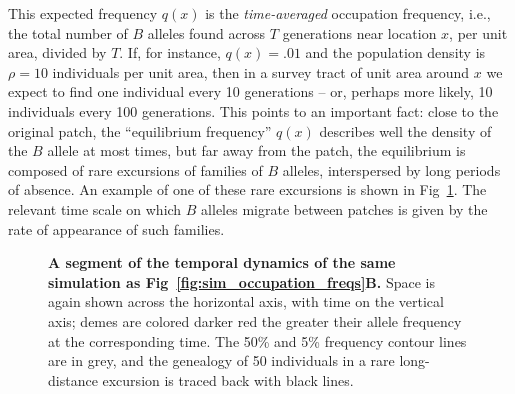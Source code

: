 \documentclass[10pt,letterpaper]{article}
\begin{document}
This expected frequency $q(x)$ is the \emph{time-averaged} occupation frequency,
i.e., the total number of $B$ alleles found across $T$ generations near location $x$, per unit area, divided by $T$.
If, for instance, $q(x)=.01$ and the population density is $\rho=10$ individuals per unit area, 
then in a survey tract of unit area around $x$ we expect to find one individual every 10 generations
-- or, perhaps more likely, 10 individuals every 100 generations.
This points to an important fact: 
close to the original patch, the ``equilibrium frequency'' $q(x)$ describes well the density of the $B$ allele at most times,
but far away from the patch, 
the equilibrium is composed of rare excursions of families of $B$
alleles, interspersed by long periods of absence. 
An example of one of these rare excursions is shown in Fig~\ref{fig:sim_snapshots}.
The relevant time scale on which $B$ alleles migrate between patches is given by the rate of appearance of such families.

\begin{figure}[ht!]
  \begin{center}
  \end{center}
  \caption{
      \textbf{A segment of the temporal dynamics of the same simulation as Fig~\ref{fig:sim_occupation_freqs}B.}
  Space is again shown across the horizontal axis, with time on the vertical axis; 
  demes are colored darker red the greater their allele frequency at the corresponding time.
  The 50\% and 5\% frequency contour lines are in grey,
  and the genealogy of 50 individuals in a rare long-distance excursion is traced back with black lines.
  }   \label{fig:sim_snapshots}
\end{figure}
\end{document}
